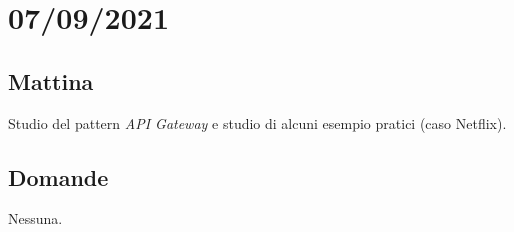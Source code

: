 \section{07/09/2021}
\subsection{Mattina}
Studio del pattern \textit{API Gateway} e studio di alcuni esempio pratici (caso Netflix).
\subsection{Domande}
Nessuna.

